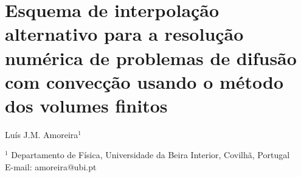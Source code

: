 \documentclass[11pt,twoside]{article}
\begin{document}

\section*{Esquema de interpolação alternativo para a reso\-lução numérica de
problemas de difusão com convecção usando o método dos volumes finitos}

\vspace{10pt}


Luís J.M. Amoreira$^{1}$%

\vspace{10pt}



{
\center

    \footnotesize

$^{1}$ Departamento de Física, Universidade da Beira Interior, Covilhã,
Portugal\\
E-mail: amoreira@ubi.pt
%
%
%
%

}

\vspace{25pt}

\end{document}
